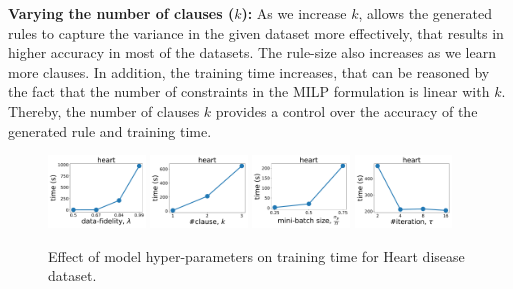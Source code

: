 	{\textbf{Varying the number of clauses ($ k $): }}
	As we increase  $ k $, {\crr} allows the generated rules to capture the variance in the given dataset more effectively, that results in higher  accuracy in most of the datasets. The  rule-size also increases as we learn more clauses. In addition, the training time  increases, that can be reasoned by the fact that the number of constraints in the MILP formulation is linear with $ k $. Thereby, the number of clauses $ k $ provides a control over the accuracy of the generated rule and training time. 
	 
	 \begin{figure}[btp]
	 	\centering
	 	\subfloat
	 	{\includegraphics[width=0.23\textwidth]{figures/interpretability/relaxed-cnf/heart_time_vary_lambda.pdf}\label{interpretability_crr_fig:c}} \hfill
	 	\subfloat
	 	{\includegraphics[width=0.23\textwidth]{figures/interpretability/relaxed-cnf/heart_time_vary_clause.pdf}\label{interpretability_crr_fig:h}} \hfill
	 		\subfloat
	 		{\includegraphics[width=0.23\textwidth]{figures/interpretability/relaxed-cnf/heart_time_vary_subsamplesize.pdf}\label{interpretability_crr_fig:b}} \hfill 
	 		\subfloat
	 		{\includegraphics[width=0.23\textwidth]{figures/interpretability/relaxed-cnf/heart_time_vary_iteration.pdf}\label{interpretability_crr_fig:e}} \hfill
	 	\caption{Effect of model hyper-parameters on training  time for  Heart disease dataset.} 
	 	
	 	\vspace{-10pt}
	 	\label{interpretability_crr_fig:result_3}
	 \end{figure}
	 
